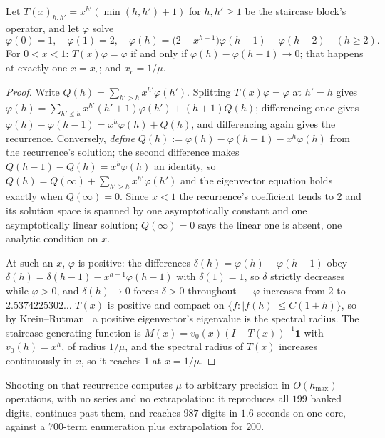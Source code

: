 \documentclass[11pt]{article}
\begin{document}
\begin{proposition}
\label{prop:phi}
Let $T(x)_{h,h'} = x^{h'}(\min(h,h')+1)$ for $h,h' \ge 1$ be the staircase
block's operator, and let $\varphi$ solve
\[
  \varphi(0) = 1, \quad \varphi(1) = 2, \quad
  \varphi(h) = \bigl(2 - x^{h-1}\bigr)\varphi(h{-}1) - \varphi(h{-}2)
  \quad (h \ge 2).
\]
For $0 < x < 1$: $T(x)\varphi = \varphi$ if and only if
$\varphi(h) - \varphi(h{-}1) \to 0$; that happens at exactly one $x = x_c$; and
$x_c = 1/\mu$.
\end{proposition}

\begin{proof}
Write $Q(h) = \sum_{h'>h}x^{h'}\varphi(h')$. Splitting $T(x)\varphi = \varphi$
at $h' = h$ gives $\varphi(h) = \sum_{h'\le h}x^{h'}(h'{+}1)\varphi(h') +
(h{+}1)Q(h)$; differencing once gives
$\varphi(h)-\varphi(h{-}1) = x^h\varphi(h) + Q(h)$, and differencing again gives
the recurrence. Conversely, \emph{define}
$Q(h) := \varphi(h)-\varphi(h{-}1)-x^h\varphi(h)$ from the recurrence's
solution; the second difference makes $Q(h{-}1)-Q(h) = x^h\varphi(h)$ an
identity, so $Q(h) = Q(\infty) + \sum_{h'>h}x^{h'}\varphi(h')$ and the
eigenvector equation holds exactly when $Q(\infty) = 0$. Since $x < 1$ the
recurrence's coefficient tends to $2$ and its solution space is spanned by one
asymptotically constant and one asymptotically linear solution; $Q(\infty) = 0$
says the linear one is absent, one analytic condition on $x$.

At such an $x$, $\varphi$ is positive: the differences
$\delta(h) = \varphi(h)-\varphi(h{-}1)$ obey
$\delta(h) = \delta(h{-}1) - x^{h-1}\varphi(h{-}1)$ with $\delta(1) = 1$, so
$\delta$ strictly decreases while $\varphi > 0$, and $\delta(h) \to 0$ forces
$\delta > 0$ throughout --- $\varphi$ increases from $2$ to $2.5374225302\dots$
$T(x)$ is positive and compact on $\{f : |f(h)| \le C(1+h)\}$, so by
Krein--Rutman~\cite{kreinRutman1948} a positive eigenvector's eigenvalue is the
spectral radius. The staircase generating function is
$M(x) = v_0(x)(I-T(x))^{-1}\mathbf 1$ with $v_0(h) = x^h$, of radius $1/\mu$,
and the spectral radius of $T(x)$ increases continuously in $x$, so it reaches
$1$ at $x = 1/\mu$.
\end{proof}

Shooting on that recurrence computes $\mu$ to arbitrary precision in
$O(h_{\max})$ operations, with no series and no extrapolation: it reproduces
all $199$ banked digits, continues past them, and reaches $987$ digits in
$1.6$ seconds on one core, against a $700$-term enumeration plus extrapolation
for $200$.
\end{document}
